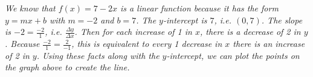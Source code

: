 \documentclass[11pt,letterpaper]{article}
\begin{document}
{\itshape We know that $f(x)= 7 - 2x$ is a linear function because it has the form $y= mx + b$ with $m= -2$ and $b= 7$. The $y$-intercept is $7$, i.e. $(0, 7)$. The slope is $-2= \frac{-2}{1}$, i.e. $\frac{\Delta y}{\Delta x}$. Then for each increase of 1 in $x$, there is a decrease of 2 in $y$. Because $\frac{-2}{1}= \frac{2}{-1}$, this is equivalent to every 1 decrease in $x$ there is an increase of 2 in $y$. Using these facts along with the $y$-intercept, we can plot the points on the graph above to create the line.}
\end{document}
